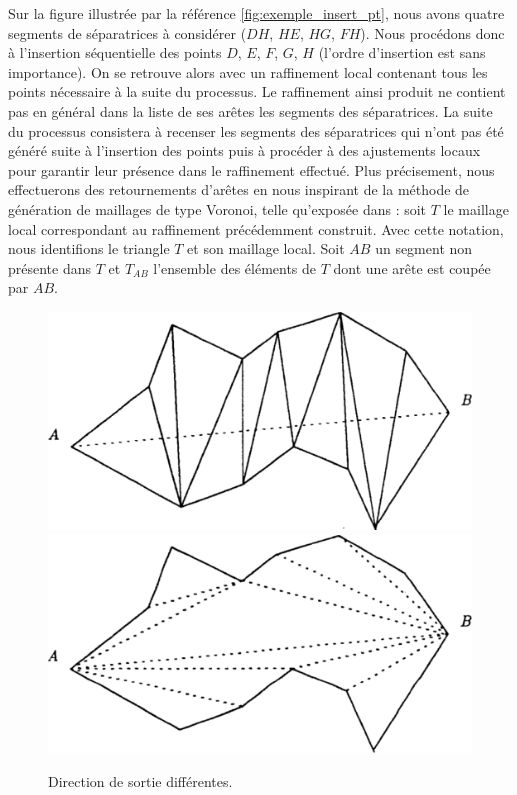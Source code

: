 Sur la figure illustrée par la référence \ref{fig:exemple_insert_pt}, nous avons quatre segments de séparatrices à considérer ($DH$, $HE$, $HG$, $FH$). Nous procédons donc à l'insertion séquentielle des points $D$, $E$, $F$, $G$, $H$ (l'ordre d'insertion est sans importance). On se retrouve alors avec un raffinement local contenant tous les points nécessaire à la suite du processus. Le raffinement ainsi produit ne contient pas en général dans la liste de ses arêtes les segments des séparatrices. La suite du processus consistera à recenser les segments des séparatrices qui n'ont pas été généré suite à l'insertion des points puis à procéder à des ajustements locaux pour garantir leur présence dans le raffinement effectué. Plus précisement, nous effectuerons des retournements d'arêtes en nous inspirant de la méthode de génération de maillages de type Voronoi, telle qu'exposée dans \cite{georgegeneration}: soit $T$ le maillage local correspondant au raffinement précédemment construit. Avec cette notation, nous identifions le triangle $T$ et son maillage local. Soit $AB$ un segment non présente dans $T$ et $T_{AB}$ l'ensemble des éléments de $T$ dont une arête est coupée par $AB$.

\begin{figure}[h!]
\centering
\includegraphics[scale=0.275]{images/retourn_arete_george-1.pdf}\hfill
\includegraphics[scale=0.275]{images/retourn_arete_george-2.pdf}
\caption{Direction de sortie différentes.}
\label{fig:retournement_arete}
\end{figure}




